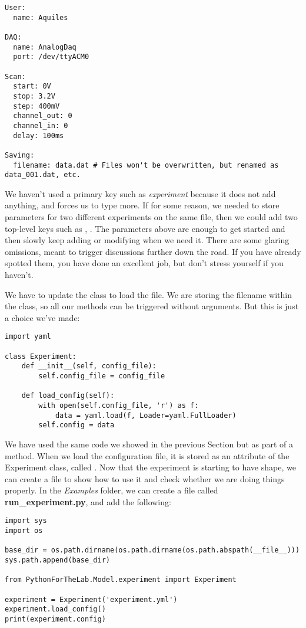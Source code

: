 \begin{verbatim}
User:
  name: Aquiles

DAQ:
  name: AnalogDaq
  port: /dev/ttyACM0

Scan:
  start: 0V
  stop: 3.2V
  step: 400mV
  channel_out: 0
  channel_in: 0
  delay: 100ms

Saving:
  filename: data.dat # Files won't be overwritten, but renamed as data_001.dat, etc.
\end{verbatim}

We haven't used a primary key such as \emph{experiment} because it does not add anything, and forces us to type more. If for some reason, we needed to store parameters for two different experiments on the same file, then we could add two top-level keys such as , . The parameters above are enough to get started and then slowly keep adding or modifying when we need it. There are some glaring omissions, meant to trigger discussions further down the road. If you have already spotted them, you have done an excellent job, but don't stress yourself if you haven't.

We have to update the  class to load the file. We are storing the filename within the class, so all our methods can be triggered without arguments. But this is just a choice we've made:

\begin{verbatim}
import yaml

class Experiment:
    def __init__(self, config_file):
        self.config_file = config_file

    def load_config(self):
        with open(self.config_file, 'r') as f:
            data = yaml.load(f, Loader=yaml.FullLoader)
        self.config = data
\end{verbatim}

We have used the same code we showed in the previous Section but as part of a method. When we load the configuration file, it is stored as an attribute of the Experiment class, called . Now that the experiment is starting to have shape, we can create a file to show how to use it and check whether we are doing things properly. In the \emph{Examples} folder, we can create a file called \textbf{run\_experiment.py}, and add the following:

\begin{verbatim}
import sys
import os

base_dir = os.path.dirname(os.path.dirname(os.path.abspath(__file__)))
sys.path.append(base_dir)

from PythonForTheLab.Model.experiment import Experiment

experiment = Experiment('experiment.yml')
experiment.load_config()
print(experiment.config)
\end{verbatim}

